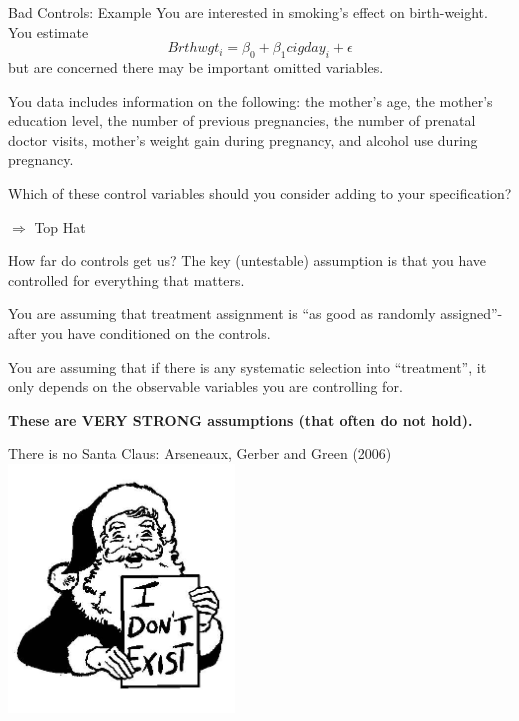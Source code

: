 \documentclass[
  ignorenonframetext,
]{beamer}
\begin{document}
\begin{frame}{Bad Controls: Example}
\protect\hypertarget{bad-controls-example}{}
You are interested in smoking's effect on birth-weight. You estimate \[
Brthwgt_i=\beta_0+\beta_1cigday_i+\epsilon
\] but are concerned there may be important omitted variables.

You data includes information on the following: the mother's age, the
mother's education level, the number of previous pregnancies, the number
of prenatal doctor visits, mother's weight gain during pregnancy, and
alcohol use during pregnancy.

Which of these control variables should you consider adding to your
specification?

\(\Rightarrow\) Top Hat
\end{frame}

\begin{frame}{How far do controls get us?}
\protect\hypertarget{how-far-do-controls-get-us}{}
The key (untestable) assumption is that you have controlled for
everything that matters.

You are assuming that treatment assignment is ``as good as randomly
assigned''- after you have conditioned on the controls.

You are assuming that if there is any systematic selection into
``treatment'', it only depends on the observable variables you are
controlling for.

\textbf{These are VERY STRONG assumptions (that often do not hold).}
\end{frame}

\begin{frame}{There is no Santa Claus: Arseneaux, Gerber and Green
(2006)}
\protect\hypertarget{there-is-no-santa-claus-arseneaux-gerber-and-green-2006}{}
\center \includegraphics[width=0.45\textwidth,height=\textheight]{"images/santa.jpg"}
\end{frame}
\end{document}
